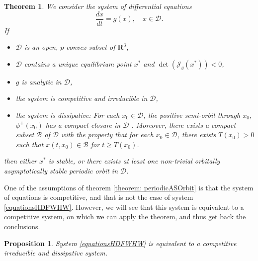 \documentclass{article}
\newtheorem{theorem}{Theorem}
\newtheorem{prop}{Proposition}
\begin{document}
\begin{theorem}\cite{zhu_stable_1994}\label{theorem: periodicASOrbit}
We consider the system of differential equations
$$
\dfrac{dx}{dt} = g(x), \quad x \in \mathcal{D}.
$$
If
\begin{itemize}
\item $\mathcal{D}$ is an open, $p$-convex subset of $\mathbf{R}^3$,
\item $\mathcal{D}$ contains a unique equilibrium point $x^*$ and $\det(\mathcal{J}_g(x^*)) < 0$,
\item $g$ is analytic in $\mathcal{D}$,
\item the system is competitive and irreducible in $\mathcal{D}$,
\item the system is dissipative: For each $x_0 \in \mathcal{D}$, the positive semi-orbit through $x_0$, $\phi^+(x_0)$ has a compact closure in $\mathcal{D}$ . Moreover, there exists a compact subset $\mathcal{B}$ of $\mathcal{D}$ with the property that for each $x_0 \in \mathcal{D}$, there exists $T(x_0) > 0$ such that $x(t, x_0) \in \mathcal{B}$ for $t \geq T(x_0)$.
\end{itemize}

then either $x^*$ is stable, or there exists at least one non-trivial orbitally asymptotically stable  periodic orbit in $\mathcal{D}$.
\end{theorem}

One of the assumptions of theorem \eqref{theorem: periodicASOrbit} is that the system of equations is competitive, and that is not the case of system \eqref{equationsHDFWHW}. However, we will see that this system is equivalent to a competitive system, on which we can apply the theorem, and thus get back the conclusions.

\begin{prop}
System \eqref{equationsHDFWHW} is equivalent to a competitive irreducible and dissipative system.
\end{prop}
\end{document}
